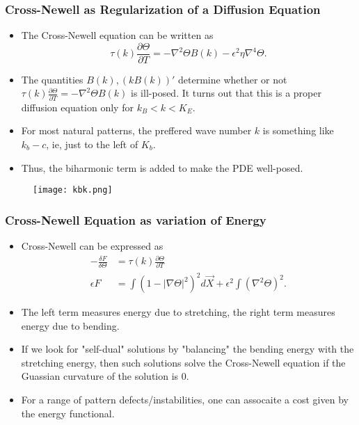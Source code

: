 \documentclass[]{beamer}
\begin{document}
\begin{frame}
     \frametitle{Cross-Newell as Regularization of a Diffusion Equation}
    \begin{itemize}
 \item The Cross-Newell equation can be written as
     \[
      \tau(k)\frac{\partial \Theta}{\partial T} = -\nabla^2\Theta B(k) - \epsilon^2 \eta \nabla^4 \Theta.
     \] 
  \item The quantities $B(k), (kB(k))'$ determine whether or not $\tau(k)\frac{\partial \Theta}{\partial T} = -\nabla^2\Theta B(k) $ is ill-posed. It turns out that this is a proper diffusion equation only for $k_B < k < K_E$.
\item For most natural patterns, the preffered wave number $k$ is something like $k_b-c$, ie, just to the left of $K_b$.
\item Thus, the biharmonic term is added to make the PDE well-posed.
    \end{itemize}
     \begin{figure}
        \centering
        \texttt{[image: kbk.png]}
      \end{figure}
\end{frame}

\begin{frame}
     \frametitle{Cross-Newell Equation as variation of Energy}
     \begin{itemize}
         \item Cross-Newell can be expressed as
             \begin{align*}
                 -\frac{\delta F}{\delta \Theta} &= \tau(k)\frac{\partial \Theta}{\partial T}\\
                 \epsilon F &= \int \left( 1 - |\nabla\Theta|^2\right)^2 d\vec{X} + \epsilon^2 \int \left(\nabla^2 \Theta\right)^2.
             \end{align*}
         \item The left term measures energy due to stretching, the right term measures energy due to bending.
        \item If we look for "self-dual" solutions by "balancing" the bending energy with the stretching energy, then such solutions solve the Cross-Newell equation if the Guassian curvature of the solution is 0.
        \item For a range of pattern defects/instabilities, one can assocaite a cost given by the energy functional.
     \end{itemize}
\end{frame}
\end{document}

